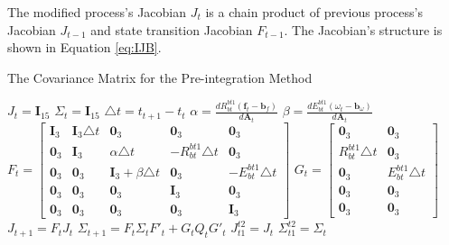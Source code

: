 \documentclass[12pt]{article}   %
\begin{document}
The modified process's Jacobian $J_{t}$ is a chain product of previous process's Jacobian $J_{t-1}$ and state transition Jacobian $F_{t-1}$. The Jacobian's structure is shown in Equation \ref{eq:IJB}.
\begin{algorithm}[h!]
	\caption{The Covariance Matrix for the Pre-integration Method}
	\label{algm:preint_cov}
	\begin{algorithmic}%
		\STATE $J_t = \textbf{I}_{15}$ 
		\STATE ${\Sigma}_t = \textbf{I}_{15}$ 
		\STATE $\triangle t =  t_{t+1} - t_t$ 
		\STATE $\alpha = \frac{d R^{bt1}_{bt} (\textbf{f}_t - \textbf{b}_f)}{d \textbf{A}_t}$
		\STATE $\beta = \frac{d E^{bt1}_{bt} (\omega_t - \textbf{b}_\omega)}{d \textbf{A}_t}$
		\STATE $F_t = \begin{bmatrix} \textbf{I}_3 & \textbf{I}_3 \triangle t & \textbf{0}_3 & \textbf{0}_3 & \textbf{0}_3 \\ \textbf{0}_3 & \textbf{I}_3  & \alpha \triangle t & -R^{bt1}_{bt} \triangle t & \textbf{0}_3 \\ \textbf{0}_3 & \textbf{0}_3 & \textbf{I}_3 + \beta \triangle t & \textbf{0}_3 & -E^{bt1}_{bt} \triangle t \\ \textbf{0}_3 & \textbf{0}_3 & \textbf{0}_3 & \textbf{I}_3 & \textbf{0}_3 \\ \textbf{0}_3 & \textbf{0}_3 & \textbf{0}_3 & \textbf{0}_3 & \textbf{I}_3\end{bmatrix}$
		\STATE $G_t = \begin{bmatrix} \textbf{0}_3 & \textbf{0}_3 \\ R^{bt1}_{bt} \triangle t & \textbf{0}_3 \\ \textbf{0}_3 & E^{bt1}_{bt} \triangle t \\ \textbf{0}_3 & \textbf{0}_3 \\ \textbf{0}_3 & \textbf{0}_3 \end{bmatrix}$
		\STATE $J_{t+1} = F_{t} J_t$ 
		\STATE ${\Sigma}_{t+1} = F_{t} {\Sigma}_t F'_{t} + G_t Q_t G'_t$ 
		\ENDFOR
		\STATE $J^{t2}_{t1} = J_{t}$
		\STATE ${\Sigma}^{t2}_{t1} = {\Sigma}_{t}$
	\end{algorithmic}
\end{algorithm}
\end{document}
